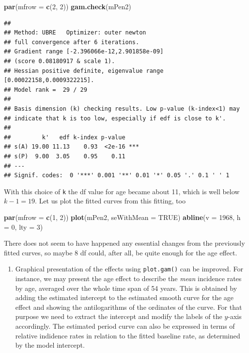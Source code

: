 \documentclass[
]{book}
\newenvironment{Shaded}{\begin{snugshade}}{\end{snugshade}}
\newcommand{\AttributeTok}[1]{\textcolor[rgb]{0.13,0.29,0.53}{#1}}
\newcommand{\ConstantTok}[1]{\textcolor[rgb]{0.56,0.35,0.01}{#1}}
\newcommand{\DecValTok}[1]{\textcolor[rgb]{0.00,0.00,0.81}{#1}}
\newcommand{\FunctionTok}[1]{\textcolor[rgb]{0.13,0.29,0.53}{\textbf{#1}}}
\newcommand{\NormalTok}[1]{#1}
\providecommand{\tightlist}{%
  \setlength{\itemsep}{0pt}\setlength{\parskip}{0pt}}
\begin{document}
\begin{Shaded}
\begin{Highlighting}[]
\FunctionTok{par}\NormalTok{(}\AttributeTok{mfrow =} \FunctionTok{c}\NormalTok{(}\DecValTok{2}\NormalTok{, }\DecValTok{2}\NormalTok{))}
\FunctionTok{gam.check}\NormalTok{(mPen2)}
\end{Highlighting}
\end{Shaded}

\begin{verbatim}
## 
## Method: UBRE   Optimizer: outer newton
## full convergence after 6 iterations.
## Gradient range [-2.396066e-12,2.901858e-09]
## (score 0.08180917 & scale 1).
## Hessian positive definite, eigenvalue range [0.00022158,0.0009322215].
## Model rank =  29 / 29 
## 
## Basis dimension (k) checking results. Low p-value (k-index<1) may
## indicate that k is too low, especially if edf is close to k'.
## 
##         k'   edf k-index p-value    
## s(A) 19.00 11.13    0.93  <2e-16 ***
## s(P)  9.00  3.05    0.95    0.11    
## ---
## Signif. codes:  0 '***' 0.001 '**' 0.01 '*' 0.05 '.' 0.1 ' ' 1
\end{verbatim}

With this choice of \texttt{k} the df value for age became about 11,
which is well below \(k-1 = 19\). Let us plot the fitted curves from
this fitting, too

\begin{Shaded}
\begin{Highlighting}[]
\FunctionTok{par}\NormalTok{(}\AttributeTok{mfrow =} \FunctionTok{c}\NormalTok{(}\DecValTok{1}\NormalTok{, }\DecValTok{2}\NormalTok{))}
\FunctionTok{plot}\NormalTok{(mPen2, }\AttributeTok{seWithMean =} \ConstantTok{TRUE}\NormalTok{)}
\FunctionTok{abline}\NormalTok{(}\AttributeTok{v =} \DecValTok{1968}\NormalTok{, }\AttributeTok{h =} \DecValTok{0}\NormalTok{, }\AttributeTok{lty =} \DecValTok{3}\NormalTok{)}
\end{Highlighting}
\end{Shaded}

There does not seem to have happened any essential changes from the
previously fitted curves, so maybe 8 df could, after all, be quite
enough for the age effect.

\begin{enumerate}
\def\labelenumi{\arabic{enumi}.}
\setcounter{enumi}{4}
\tightlist
\item
  Graphical presentation of the effects using \texttt{plot.gam()}
  can be improved. For instance, we may present the
  age effect to describe the \emph{mean} incidence rates by age, averaged
  over the whole time span of 54 years. This is obtained by adding
  the estimated intercept
  to the estimated smooth curve for the age effect and showing
  the antilogarithms of the ordinates of the curve.
  For that purpose we need to extract the intercept and modify the
  labels of the \(y\)-axis accordingly. The estimated period curve
  can also be expressed in terms of
  relative indidence rates in relation to the fitted baseline rate,
  as determined by the model intercept.
\end{enumerate}
\end{document}
